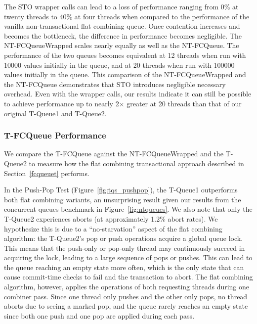 The STO wrapper calls can lead to a loss of performance ranging from 0\% at twenty threads to 40\% at four threads when compared to the performance of the vanilla non-transactional flat combining queue. Once contention increases and becomes the bottleneck, the difference in performance becomes negligible. The NT-FCQueueWrapped scales nearly equally as well as the NT-FCQueue. The performance of the two queues becomes equivalent at 12 threads when run with 10000 values initially in the queue, and at 20 threads when run with 100000 values initially in the queue. This comparison of the NT-FCQueueWrapped and the NT-FCQueue demonstrates that STO introduces negligible necessary overhead. Even with the wrapper calls, our results indicate it can still be possible to achieve performance up to nearly 2$\times$ greater at 20 threads than that of our original T-Queue1 and T-Queue2.

\subsubsection{T-FCQueue Performance}
We compare the T-FCQueue against the NT-FCQueueWrapped and the T-Queue2 to measure how the flat combining transactional approach described in Section~\ref{fcqueuet} performs.

In the Push-Pop Test (Figure~\ref{fig:tqs_pushpop}), the T-Queue1 outperforms both flat combining variants, an unsurprising result given our results from the concurrent queues benchmark in Figure~\ref{fig:ntqueues}. We also note that only the T-Queue2 experiences aborts (at approximately 1.2\% abort rates). We hypothesize this is due to a ``no-starvation'' aspect of the flat combining algorithm: the T-Queue2's pop or push operations acquire a global queue lock. This means that the push-only or pop-only thread may continuously succeed in acquiring the lock, leading to a large sequence of pops or pushes. This can lead to the queue reaching an empty state more often, which is the only state that can cause commit-time checks to fail and the transaction to abort. The flat combining algorithm, however, applies the operations of both requesting threads during one combiner pass. Since one thread only pushes and the other only pops, no thread aborts due to seeing a marked pop, and the queue rarely reaches an empty state since both one push and one pop are applied during each pass.


